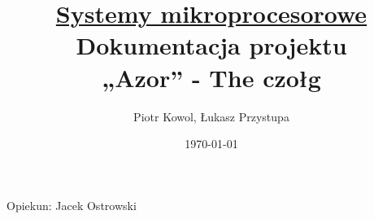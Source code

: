 \documentclass[12pt]{article}
\title{\underline{Systemy mikroprocesorowe}\\\textbf{Dokumentacja projektu}\\„Azor” - The czołg}
\author{Piotr Kowol, Łukasz Przystupa}
\date{\today}
\begin{document}
    \maketitle
    \begin{center}
        Opiekun: Jacek Ostrowski
    \end{center}
    \thispagestyle{empty}
    \newpage


    
    \thispagestyle{empty}
    \newpage
    
    \tableofcontents
    \newpage
    
    
    
    
    
    
\end{document}
